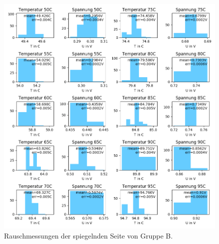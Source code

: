 \documentclass[12pt,a4paper]{article}
\begin{document}
\begin{figure}[h]
\includegraphics[scale=0.8]{Bilder/Rauschen_B_spiegel_2.png}
\caption{Rauschmessungen der spiegelnden Seite von Gruppe B.}
\label{fig:RegSpiegel}
\end{figure}
	
\end{document}
